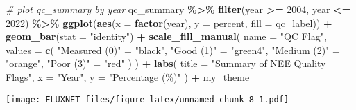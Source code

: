 \documentclass[
]{article}
\newenvironment{Shaded}{\begin{snugshade}}{\end{snugshade}}
\newcommand{\AttributeTok}[1]{\textcolor[rgb]{0.13,0.29,0.53}{#1}}
\newcommand{\CommentTok}[1]{\textcolor[rgb]{0.56,0.35,0.01}{\textit{#1}}}
\newcommand{\DecValTok}[1]{\textcolor[rgb]{0.00,0.00,0.81}{#1}}
\newcommand{\FunctionTok}[1]{\textcolor[rgb]{0.13,0.29,0.53}{\textbf{#1}}}
\newcommand{\NormalTok}[1]{#1}
\newcommand{\OtherTok}[1]{\textcolor[rgb]{0.56,0.35,0.01}{#1}}
\newcommand{\SpecialCharTok}[1]{\textcolor[rgb]{0.81,0.36,0.00}{\textbf{#1}}}
\newcommand{\StringTok}[1]{\textcolor[rgb]{0.31,0.60,0.02}{#1}}
\begin{document}
\begin{Shaded}
\begin{Highlighting}[]
\CommentTok{\# plot qc\_summary by year}
\NormalTok{qc\_summary }\SpecialCharTok{\%\textgreater{}\%}
  \FunctionTok{filter}\NormalTok{(year }\SpecialCharTok{\textgreater{}=} \DecValTok{2004}\NormalTok{, year }\SpecialCharTok{\textless{}=} \DecValTok{2022}\NormalTok{) }\SpecialCharTok{\%\textgreater{}\%}
  \FunctionTok{ggplot}\NormalTok{(}\FunctionTok{aes}\NormalTok{(}\AttributeTok{x =} \FunctionTok{factor}\NormalTok{(year), }\AttributeTok{y =}\NormalTok{ percent, }\AttributeTok{fill =}\NormalTok{ qc\_label)) }\SpecialCharTok{+}
  \FunctionTok{geom\_bar}\NormalTok{(}\AttributeTok{stat =} \StringTok{"identity"}\NormalTok{) }\SpecialCharTok{+}
  \FunctionTok{scale\_fill\_manual}\NormalTok{(}
    \AttributeTok{name =} \StringTok{"QC Flag"}\NormalTok{,}
    \AttributeTok{values =} \FunctionTok{c}\NormalTok{(}
      \StringTok{"Measured (0)"} \OtherTok{=} \StringTok{"black"}\NormalTok{,}
      \StringTok{"Good (1)"} \OtherTok{=} \StringTok{"green4"}\NormalTok{,}
      \StringTok{"Medium (2)"} \OtherTok{=} \StringTok{"orange"}\NormalTok{,}
      \StringTok{"Poor (3)"} \OtherTok{=} \StringTok{"red"}
\NormalTok{    )}
\NormalTok{  ) }\SpecialCharTok{+}
  \FunctionTok{labs}\NormalTok{(}
    \AttributeTok{title =} \StringTok{"Summary of NEE Quality Flags"}\NormalTok{,}
    \AttributeTok{x =} \StringTok{"Year"}\NormalTok{, }\AttributeTok{y =} \StringTok{"Percentage (\%)"}
\NormalTok{  ) }\SpecialCharTok{+}\NormalTok{ my\_theme}
\end{Highlighting}
\end{Shaded}

\texttt{[image: FLUXNET\_files/figure-latex/unnamed-chunk-8-1.pdf]}
\end{document}
